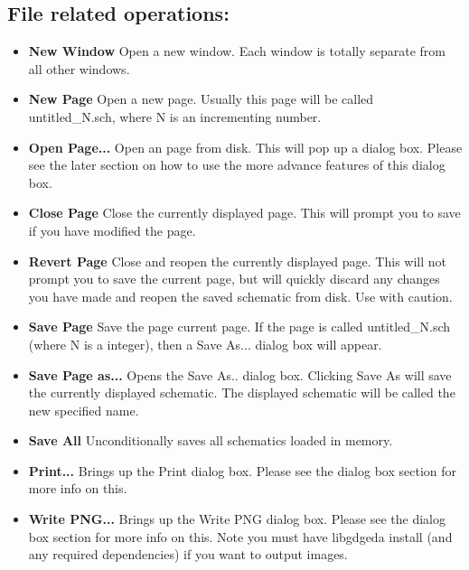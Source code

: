 \documentclass{article}
\begin{document}
\subsection{File related operations:}

\begin{itemize}
\item {\bf New Window} Open a new window.  Each window is totally
  separate from all other windows.
  
\item {\bf New Page} Open a new page.  Usually this page will be
  called untitled\_N.sch, where N is an incrementing number.
  
\item {\bf Open Page...}  Open an page from disk.  This will pop up a
  dialog box.  Please see the later section on how to use the more
  advance features of this dialog box.
  
\item {\bf Close Page} Close the currently displayed page.  This will
  prompt you to save if you have modified the page.

  
\item {\bf Revert Page} Close and reopen the currently displayed page.
  This will not prompt you to save the current page, but will quickly
  discard any changes you have made and reopen the saved schematic
  from disk.  Use with caution.
        
\item {\bf Save Page} Save the page current page.  If the page is
  called untitled\_N.sch (where N is a integer), then a Save As...
  dialog box will appear.
  
\item {\bf Save Page as...}  Opens the Save As.. dialog box.  Clicking
  Save As will save the currently displayed schematic.  The displayed
  schematic will be called the new specified name.
  
\item {\bf Save All} Unconditionally saves all schematics loaded in
  memory.
  
\item {\bf Print...}  Brings up the Print dialog box.  Please see the
  dialog box section for more info on this.
  
\item {\bf Write PNG...}  Brings up the Write PNG dialog box.  Please
  see the dialog box section for more info on this.  Note you must
  have libgdgeda install (and any required dependencies) if you want
  to output images.
  

\end{itemize}
\end{document}
